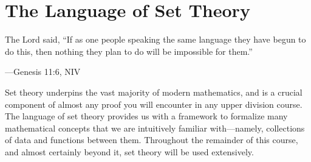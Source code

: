 \documentclass[../notes.tex]{subfiles}
\begin{document}
\chapter{The Language of Set Theory}
\epigraph{The Lord said, ``If as one people speaking the same language they have begun to do this, then nothing they plan to do will be impossible for them.''}
{---Genesis 11:6, NIV}

Set theory underpins the vast majority of modern mathematics, and is a crucial component of almost any proof you will encounter in any upper division course. The language of set theory provides us with a framework to formalize many mathematical concepts that we are intuitively familiar with---namely, collections of data and functions between them. Throughout the remainder of this course, and almost certainly beyond it, set theory will be used extensively.



% 
\end{document}
